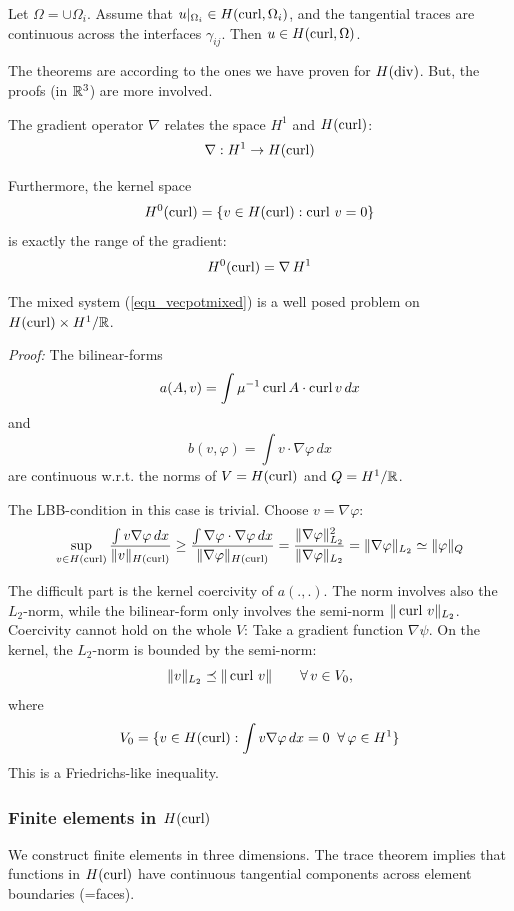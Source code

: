 \begin{theorem} Let $\Omega = \cup \Omega_i$. Assume that $u|_{\Omega_i} \in H(\operatorname{curl},\Omega_i)$,
and the tangential traces are continuous across the interfaces $\gamma_{ij}$. Then $u \in H(\operatorname{curl}, \Omega)$.
\end{theorem}


The theorems are according to the ones we have proven for $H(\operatorname{div})$. But, the proofs (in ${\mathbb R}^3$) are more involved.

\bigskip

The gradient operator $\nabla$ relates the space $H^1$ and $H(\operatorname{curl})$:
$$
\nabla : H^1 \rightarrow H(\operatorname{curl})
$$

Furthermore, the kernel space
$$
H^0(\operatorname{curl}) = \{ v \in H(\operatorname{curl}) : \operatorname{curl} \, v = 0 \}
$$
is exactly the range of the gradient:
$$
H^0(\operatorname{curl}) = \nabla \, H^1
$$



\begin{theorem} The mixed system (\ref{equ_vecpotmixed}) is a well posed problem
on $H(\operatorname{curl}) \times H^1/{\mathbb R}$.
\end{theorem}
{\em Proof:} The bilinear-forms
$$
a(A,v) = \int \mu^{-1} \operatorname{curl} A \cdot \operatorname{curl} v \, dx
$$
and 
$$
b(v, \varphi) = \int v \cdot \nabla \varphi \, dx
$$
are continuous w.r.t. the norms of $V = H(\operatorname{curl})$ and $Q = H^1/{\mathbb R}$. 

The LBB-condition in this case is trivial. Choose $v = \nabla \varphi$:
$$
\sup_{v \in H(\operatorname{curl})} \frac{ \int v \nabla \varphi \, dx } { \| v \|_{H(\operatorname{curl})}}
\geq \frac{ \int \nabla \varphi \cdot \nabla \varphi \, dx } { \| \nabla \varphi \|_{H(\operatorname{curl})}}
= \frac{ \| \nabla \varphi \|_{L_2}^2 } { \| \nabla \varphi \|_{L_2}} = \| \nabla \varphi \|_{L_2} \simeq \| \varphi \|_Q
$$

The difficult part is the kernel coercivity of $a(.,.)$. 
The norm involves also the $L_2$-norm, while the bilinear-form only involves the semi-norm
$\| \operatorname{curl} \, v \|_{L_2}$. Coercivity cannot hold on the whole $V$: Take a gradient function
$\nabla \psi$. On the kernel, the $L_2$-norm is bounded by the semi-norm:
$$
\| v \|_{L_2} \preceq \| \operatorname{curl} \, v \| \qquad \forall \, v \in V_0,
$$
where
$$
V_0 = \{ v \in H(\operatorname{curl}) :  \int v \nabla \varphi \, dx = 0 \; \; \forall \, \varphi \in H^1 \}
$$
This is a Friedrichs-like inequality.


\subsubsection{Finite elements in $H(\operatorname{curl})$}
%
We construct finite elements in three dimensions.
The trace theorem implies that functions in $H(\operatorname{curl})$ have continuous tangential 
components across element boundaries (=faces). 

